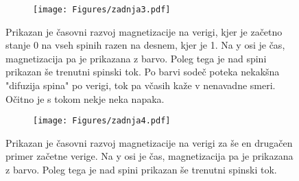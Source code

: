 \documentclass{article}
\begin{document}
\begin{figure}[H]
\centering
\begin{subfigure}{.7\textwidth}
\texttt{[image: Figures/zadnja3.pdf]}
\end{subfigure}
\caption*{Prikazan je časovni razvoj magnetizacije na verigi, kjer je začetno stanje 0 na vseh spinih razen na desnem, kjer je 1. Na y osi je čas, magnetizacija pa je prikazana z barvo. Poleg tega je nad spini prikazan še trenutni spinski tok. Po barvi sodeč poteka nekakšna "difuzija spina" po verigi, tok pa včasih kaže v nenavadne smeri. Očitno je s tokom nekje neka napaka.}
\end{figure}

\begin{figure}[H]
\centering
\begin{subfigure}{.7\textwidth}
\texttt{[image: Figures/zadnja4.pdf]}
\end{subfigure}
\caption*{Prikazan je časovni razvoj magnetizacije na verigi za še en drugačen primer začetne verige. Na y osi je čas, magnetizacija pa je prikazana z barvo. Poleg tega je nad spini prikazan še trenutni spinski tok.}
\end{figure}
\end{document}
